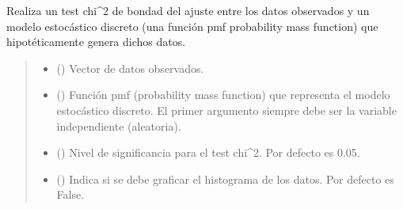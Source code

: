 \documentclass[letterpaper,10pt,english]{sphinxmanual}
\begin{document}

\begin{fulllineitems}
\label{\detokenize{myutils:myutils.stats.chisq_gof_discrete}}
\pysigstartsignatures
{}
\pysigstopsignatures
\sphinxAtStartPar
Realiza un test chi\textasciicircum{}2 de bondad del ajuste entre los datos observados y un modelo
estocástico discreto (una función pmf \sphinxhyphen{}probability mass function\sphinxhyphen{}) que hipotéticamente
genera dichos datos.
\begin{quote}\begin{description}
\begin{itemize}
\item {} 
\sphinxAtStartPar
{} () \textendash{} Vector de datos observados.

\item {} 
\sphinxAtStartPar
{} () \textendash{} Función pmf (probability mass function) que representa el modelo estocástico discreto.
El primer argumento siempre debe ser la variable independiente (aleatoria).

\item {} 
\sphinxAtStartPar
{} (\sphinxstyleliteralemphasis{\sphinxupquote{, }}) \textendash{} Nivel de significancia para el test chi\textasciicircum{}2. Por defecto es 0.05.

\item {} 
\sphinxAtStartPar
{} (\sphinxstyleliteralemphasis{\sphinxupquote{, }}) \textendash{} Indica si se debe graficar el histograma de los datos. Por defecto es False.


\end{itemize}
\end{description}
\end{quote}
\end{fulllineitems}
\end{document}
